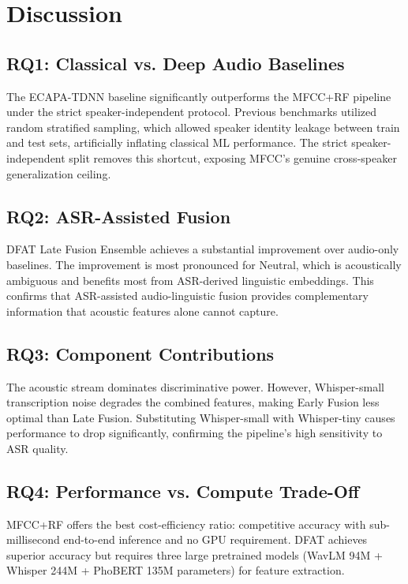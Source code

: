 \documentclass[12pt,a4paper]{report}
\begin{document}
\begin{table}[h]
\centering
\caption{DFAT ablation study.}
\label{tab:ablation}
\end{table}

\chapter{Discussion}

\section{RQ1: Classical vs. Deep Audio Baselines}
The ECAPA-TDNN baseline significantly outperforms the MFCC+RF pipeline under the strict speaker-independent protocol. Previous benchmarks utilized random stratified sampling, which allowed speaker identity leakage between train and test sets, artificially inflating classical ML performance. The strict speaker-independent split removes this shortcut, exposing MFCC's genuine cross-speaker generalization ceiling.

\section{RQ2: ASR-Assisted Fusion}
DFAT Late Fusion Ensemble achieves a substantial improvement over audio-only baselines. The improvement is most pronounced for Neutral, which is acoustically ambiguous and benefits most from ASR-derived linguistic embeddings. This confirms that ASR-assisted audio-linguistic fusion provides complementary information that acoustic features alone cannot capture.

\section{RQ3: Component Contributions}
The acoustic stream dominates discriminative power. However, Whisper-small transcription noise degrades the combined features, making Early Fusion less optimal than Late Fusion. Substituting Whisper-small with Whisper-tiny causes performance to drop significantly, confirming the pipeline's high sensitivity to ASR quality.

\section{RQ4: Performance vs. Compute Trade-Off}
MFCC+RF offers the best cost-efficiency ratio: competitive accuracy with sub-millisecond end-to-end inference and no GPU requirement. DFAT achieves superior accuracy but requires three large pretrained models (WavLM 94M + Whisper 244M + PhoBERT 135M parameters) for feature extraction.
\end{document}
